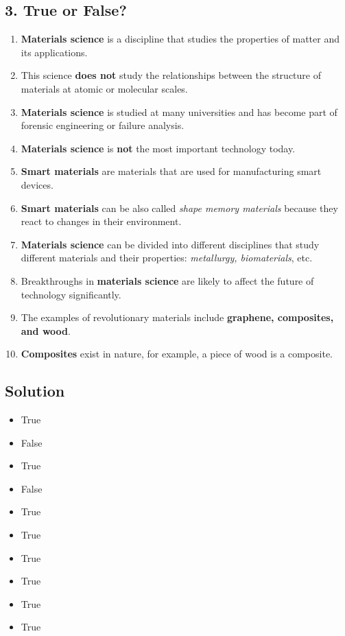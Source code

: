 \subsection*{3. True or False?}
\begin{enumerate}
      \item \textbf{Materials science} is a discipline that studies the properties of matter and its applications.
      \item This science \textbf{does not} study the relationships between the structure of materials at atomic or molecular scales.
      \item \textbf{Materials science} is studied at many universities and has become part of forensic engineering or failure analysis.
      \item \textbf{Materials science} is \textbf{not} the most important technology today.
      \item \textbf{Smart materials} are materials that are used for manufacturing smart devices.
      \item \textbf{Smart materials} can be also called \textit{shape memory materials} because they react to changes in their environment.
      \item \textbf{Materials science} can be divided into different disciplines that study different materials and their properties: \textit{metallurgy, biomaterials}, etc.
      \item Breakthroughs in \textbf{materials science} are likely to affect the future of technology significantly.
      \item The examples of revolutionary materials include \textbf{graphene, composites, and wood}.
      \item \textbf{Composites} exist in nature, for example, a piece of wood is a composite.
\end{enumerate}

\subsection*{Solution}
\begin{itemize}
      \item True
      \item False
      \item True
      \item False
      \item True
      \item True
      \item True
      \item True
      \item True
      \item True
\end{itemize}

